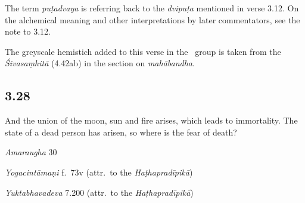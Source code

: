 \begin{ekdosis}
\begin{philcomm}[hp03_027]
The term \emph{puṭadvaya} is referring back to the \emph{dvipuṭa} mentioned in verse 3.12. On the alchemical meaning and other interpretations by later commentators, see the note to 3.12.

The greyscale hemistich added to this verse in the \textgamma\ group is taken from the \emph{Śivasaṃhitā} (4.42ab) in the section on \emph{mahābandha}.
\end{philcomm}

\subsection*{3.28}
\begin{translation}[hp03_028]
And the union of the moon, sun and fire arises, which leads to immortality.
The state of a dead person has arisen, so where is the fear of death?
\end{translation}

\begin{sources}[hp03_028]
\emph{Amaraugha} 30
\begin{versinnote}
\tl{\var{°saṃbandhaṃ ] °saṃbandhāj, °saṃbandhā \vl}\\!}
\end{versinnote}
\end{sources}

\begin{testimonia}[hp03_028]
\emph{Yogacintāmaṇi} f.~73v (attr.~to the \emph{Haṭhapradīpikā})
\begin{versinnote}
\tl{\var{°samutpannaṃ ] °samutpannā \vl}\\!}
\end{versinnote}

\emph{Yuktabhavadeva} 7.200 (attr.~to the \emph{Haṭhapradīpikā})
\begin{versinnote}
\end{versinnote}
\end{testimonia}


\end{ekdosis}
